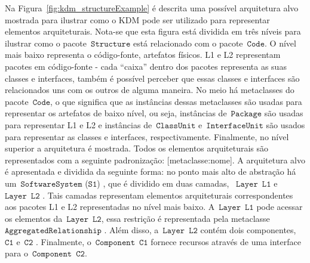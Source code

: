 \documentclass[12pt]{article}
\begin{document}
Na Figura~\ref{fig:kdm_structureExample} é descrita uma possível arquitetura alvo mostrada para ilustrar como o KDM pode ser utilizado para representar elementos arquiteturais. Nota-se que esta figura está dividida em três níveis para ilustrar como o pacote~$\mathtt{Structure}$ está relacionado com o pacote~$\mathtt{Code}$. O nível mais baixo representa o código-fonte, artefatos físicos. L1 e L2 representam pacotes em código-fonte - cada ``caixa'' dentro dos pacotes representa as suas classes e interfaces, também é possível perceber que essas classes e interfaces são relacionados uns com os outros de alguma maneira. No meio há metaclasses do pacote~$\mathtt{Code}$, o que significa que as instâncias dessas metaclasses são usadas para representar os artefatos de baixo nível, ou seja, instâncias de~$\mathtt{Package}$ são usadas para representar L1 e L2 e instâncias de~$\mathtt{ClassUnit}$ e~$\mathtt{InterfaceUnit}$ são usados para representar as classes e interfaces, respectivamente. Finalmente, no nível superior a arquitetura é mostrada. Todos os elementos arquiteturais são representados com a seguinte padronização: [metaclasse:nome]. A arquitetura alvo é apresentada e dividida da seguinte forma: no ponto mais alto de abstração há um~$\mathtt{SoftwareSystem}$ ($\mathtt{S1}$) , que é dividido em duas camadas, ~$\mathtt{Layer}$~$\mathtt{L1}$  e ~$\mathtt{Layer}$~$\mathtt{L2}$ . Tais camadas representam elementos arquiteturais correspondentes aos pacotes L1 e L2 representadas no nível mais baixo. A~$\mathtt{Layer}$~$\mathtt{L1}$ pode acessar os elementos da~$\mathtt{Layer}$~$\mathtt{L2}$, essa restrição  é representada pela metaclasse~$\mathtt{AggregatedRelationship}$ . Além disso, a~$\mathtt{Layer}$~$\mathtt{L2}$ contém dois componentes,~$\mathtt{C1}$  e~$\mathtt{C2}$ . Finalmente, o~$\mathtt{Component}$~$\mathtt{C1}$ fornece recursos através de uma interface para o~$\mathtt{Component}$~$\mathtt{C2}$.
\end{document}
